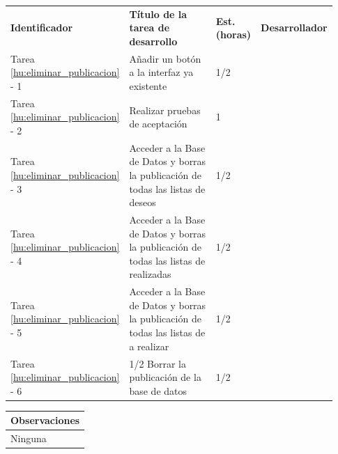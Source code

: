 \documentclass[11pt]{article}
\begin{document}
\begin{longtable}{p{0.18\linewidth}|p{0.48\linewidth}|p{0.1\linewidth}|p{0.17\linewidth}}
  \toprule
  \textbf{Identificador} & \textbf{Título de la tarea de desarrollo} & \textbf{Est. (horas)} & \textbf{Desarrollador} \\
  Tarea \ref{hu:eliminar_publicacion} - 1 & Añadir un botón a la interfaz ya existente & 1/2 &\\
  Tarea \ref{hu:eliminar_publicacion} - 2 & Realizar pruebas de aceptación& 1 & \\
    Tarea \ref{hu:eliminar_publicacion} - 3 & Acceder a la Base de Datos y borras la publicación de todas las listas de deseos & 1/2 & \\
    
    Tarea \ref{hu:eliminar_publicacion} - 4 & Acceder a la Base de Datos y borras la publicación de todas las listas de realizadas & 1/2 & \\
    
  Tarea \ref{hu:eliminar_publicacion} - 5 & Acceder a la Base de Datos y borras la publicación de todas las listas de a realizar & 1/2 & \\
  
  Tarea \ref{hu:eliminar_publicacion} - 6 & 1/2 Borrar la publicación de la base de datos & 1/2 &  \\
  \bottomrule
\end{longtable}
\vspace{-0.8cm}
\begin{longtable}{p{1.028\linewidth}}
  \textbf{Observaciones}\\
  \midrule
  Ninguna\\
  \bottomrule
\end{longtable}
\end{document}
